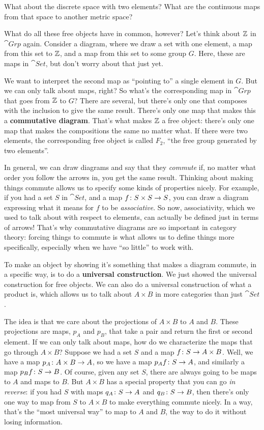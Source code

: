\documentclass[11pt,paper=letter]{scrartcl}
\begin{document}
\begin{exrboxed}
  What about the discrete space with two elements? What are the continuous maps from that space to another metric space?
\end{exrboxed}

What do all these free objects have in common, however? Let's think about $\mathbb Z$ in $\cat{Grp}$ again. Consider a diagram, where we draw a set with one element, a map from this set to $\mathbb Z$, and a map from this set to some group $G$. Here, these are maps in $\cat{Set}$, but don't worry about that just yet.

We want to interpret the second map as ``pointing to'' a single element in $G$. But we can only talk about maps, right? So what's the corresponding map in $\cat{Grp}$ that goes from $\mathbb Z$ to $G$? There are several, but there's only one that composes with the inclusion to give the same result. There's only one map that makes this a \textbf{commutative diagram}. That's what makes $\mathbb Z$ a free object: there's only one map that makes the compositions the same no matter what. If there were two elements, the corresponding free object is called $F_2$, ``the free group generated by two elements''.

In general, we can draw diagrams and say that they \textit{commute} if, no matter what order you follow the arrows in, you get the same result. Thinking about making things commute allows us to specify some kinds of properties nicely. For example, if you had a set $S$ in $\cat{Set}$, and a map $f \colon S \times S \to S$, you can draw a diagram expressing what it means for $f$ to be \textit{associative}. So now, associativity, which we used to talk about with respect to elements, can actually be defined just in terms of arrows! That's why commutative diagrams are so important in category theory: forcing things to commute is what allows us to define things more specifically, especially when we have ``so little'' to work with.

To make an object by showing it's something that makes a diagram commute, in a specific way, is to do a \textbf{universal construction}. We just showed the universal construction for free objects. We can also do a universal construction of what a product is, which allows us to talk about $A \times B$ in more categories than just $\cat{Set}$.

The idea is that we care about the projections of $A \times B$ to $A$ and $B$. These projections are maps, $p_A$ and $p_B$, that take a pair and return the first or second element. If we can only talk about maps, how do we characterize the maps that go through $A \times B$? Suppose we had a set $S$ and a map $f \colon S \to A \times B$. Well, we have a map $p_A \colon A \times B \to A$, so we have a map $p_Af \colon S \to A$, and similarly a map $p_Bf \colon S \to B$. Of course, given any set $S$, there are always going to be maps to $A$ and maps to $B$. But $A \times B$ has a special property that you can go \textit{in reverse}: if you had $S$ with maps $q_A \colon S \to A$ and $q_B \colon S \to B$, then there's only one way to map from $S$ to $A \times B$ to make everything commute nicely. In a way, that's the ``most universal way'' to map to $A$ and $B$, the way to do it without losing information.
\end{document}
